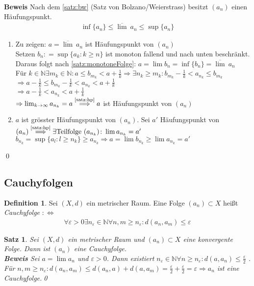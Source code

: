 \documentclass[ngerman,titlepage,twoside, parskip=half*]{scrreprt}
\newcommand*{\N}{\mathbb{N}}
\newcommand*{\perdef}{:\Leftrightarrow}
\theoremstyle{plain}
\newtheorem{theorem}{Satz}[section]
\theoremstyle{definition}
\newtheorem{definition}{Definition}
\theoremstyle{remark}
\newcommand*{\coloneqq}{\mathrel{\mathop:}=}
\begin{document}
\textbf{Beweis} Nach dem \autoref{satz:bw} (Satz von Bolzano/Weierstrass) besitzt $(a_n)$ einen Häufungspunkt.
\begin{gather*}\inf \{a_n\}\leq \overline{\lim}\ a_n \leq \sup \{a_n\}\end{gather*}
\begin{enumerate}[1. Schr{i}tt]
  \item Zu zeigen: $a=\overline{\lim}\ a_n$ ist Häufungspunkt von $(a_n)$\\
    Setzen $b_n\coloneqq\sup \{a_k\colon k\geq n\}$ ist monoton fallend und nach unten beschränkt. Daraus folgt nach
    \autoref{satz:monotoneFolge}: $a=\lim b_n=\inf \{b_n\}=\overline{\lim}\ a_n$\\
    Für $k \in \N \exists m_k \in \N \colon a\leq b_{m_k}<a+\frac{1}{k}\Rightarrow \exists n_k\geq m_k\colon b_{m_k}-\frac{1}{k}
    <a_{n_k}\leq b_{m_k}$\\
    $\Rightarrow a-\frac{1}{k}\leq b_{m_k}-\frac{1}{k}<a_{n_k}<a+\frac{1}{k}$\\
    $\Rightarrow a-\frac{1}{k}<a_{n_k}<a+\frac{1}{k}$\\
    $\Rightarrow \lim_{k\rightarrow \infty} a_{n_k}=a\stackrel{\text{\autoref{satz:hp}}}{\Longrightarrow} a$ ist Häufungspunkt 
    von $(a_n)$
  \item $a$ ist grösster Häufungspunkt von $(a_n)$. Sei $a'$ Häufungspunkt von $(a_n)\stackrel{\text{\autoref{satz:hp}}}
    {\Longrightarrow} \exists \text{Teilfolge } (a_{n_k})\colon\lim a_{n_k}=a'$\\
    $b_{n_k}=\sup \{a_l\colon l\geq n_k\} \geq a_{n_k}\Rightarrow a=\lim b_{n_k}\geq \lim a_{n_k}=a'$
\end{enumerate}
\qed

\subsection{Cauchyfolgen}
\begin{definition}
Sei $(X,d)$ ein metrischer Raum. Eine Folge $(a_n) \subset X$ heißt \emph{Cauchy\-fol\-ge} $\perdef$
\begin{gather*}\forall \varepsilon > 0 \exists n_{\varepsilon}\in \N \forall n,m \geq
  n_{\varepsilon}\colon d(a_n,a_m)\leq \varepsilon\end{gather*}
\end{definition}

\begin{theorem}
\label{satz:cf}
Sei $(X,d)$ ein metrischer Raum und $(a_n)\subset X$ eine konvergente Folge.
  Dann ist $(a_n)$ eine Cauchyfolge.\\
\textbf{Beweis} Sei $a=\lim a_n$ und $\varepsilon>0$. Dann existiert
  $n_{\varepsilon}\in \N \forall n\geq n_{\varepsilon}
\colon d(a,a_n)\leq \frac{\varepsilon}{2}$ . Für $n,m\geq n_{\varepsilon}\colon d(a_n,a_m)\leq d(a_n,a)+d(a,a_m)=\frac{\varepsilon}{2}
+\frac{\varepsilon}{2}=\varepsilon \Rightarrow a_n$ ist eine Cauchyfolge.\qed
\end{theorem}
\end{document}
